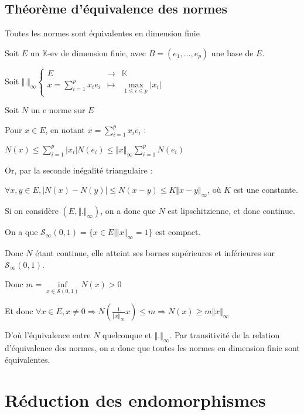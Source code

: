 \documentclass[a4paper,12pt]{book}
\newcommand{\Thr}[2]{\begin{tcolorbox}[sharp corners, colback=white,colframe=red!90!black!75, title=Théorème : #1]#2\end{tcolorbox}}
\newcommand{\Pre}[1]{\begin{tcolorbox}[sharp corners, colback=white,colframe=green!60!green!30!black!75, title=Preuve]#1\end{tcolorbox}}
\def\K{\mathbb{K}}
\begin{document}
\section{Théorème d'équivalence des normes}
\Thr{L'équivalence des normes}{Toutes les normes sont équivalentes en dimension finie}
\Pre{Soit $E$ un $\K$-ev de dimension finie, avec $B=(e_1,...,e_p)$ une base de $E$. \par Soit $\Vert.\Vert_\infty\left\{\begin{array}{rcl} E&\to&\K \\ x=\sum\limits_{i=1}^px_ie_i & \mapsto & \max\limits_{1\leq i\leq p}\vert x_i\vert \end{array}\right.$
\par Soit $N$ un e norme sur $E$ \par Pour $x\in E$, en notant $x=\sum\limits_{i=1}^px_ie_i$ : \par $N(x)\leq\sum\limits_{i=1}^p\vert x_i\vert N(e_i)\leq\Vert x\Vert_\infty\sum\limits_{i=1}^p N(e_i)$ \par Or, par la seconde inégalité triangulaire : \par $\forall x,y\in E, \vert N(x)-N(y)\vert\leq N(x-y)\leq K\Vert x-y\Vert_\infty$, où $K$ est une constante. \par Si on considère $(E,\Vert.\Vert_\infty)$, on a donc que $N$ est lipschitzienne, et donc continue.
\par On a que $\mathcal{S}_\infty(0,1)=\{x\in E\vert \Vert x\Vert_\infty=1\}$ est compact. \par Donc $N$ étant continue, elle atteint ses bornes supérieures et inférieures sur $\mathcal{S}_\infty(0,1)$. \par Donc $m=\inf\limits_{x\in\mathcal{S}(0,1)}N(x)>0$ \par Et donc $\forall x\in E,x\neq 0\Rightarrow N\left(\frac{1}{\Vert x\Vert_\infty}x\right)\leq m\Rightarrow N(x)\geq m\Vert x\Vert_\infty$
\par D'où l'équivalence entre $N$ quelconque et $\Vert.\Vert_\infty$. Par transitivité de la relation d'équivalence des normes, on a donc que toutes les normes en dimension finie sont équivalentes.}



\chapter{Réduction des endomorphismes}
\end{document}

